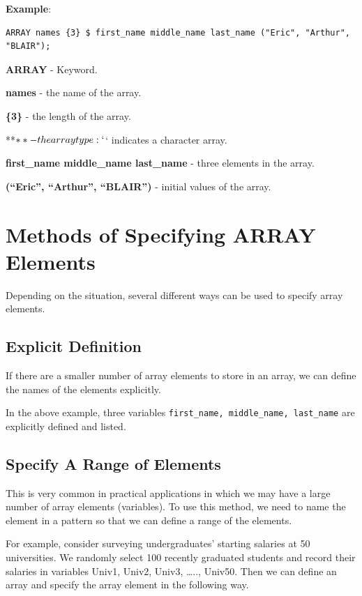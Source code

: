 \documentclass[
]{book}
\begin{document}
\textbf{Example}:

\begin{verbatim}
ARRAY names {3} $ first_name middle_name last_name ("Eric", "Arthur", "BLAIR");
\end{verbatim}

\textbf{ARRAY} - Keyword.

\textbf{names} - the name of the array.

\textbf{\{3\}} - the length of the array.

**\(** - the array type: `\)` indicates a character array.

\textbf{first\_name middle\_name last\_name} - three elements in the array.

\textbf{(``Eric'', ``Arthur'', ``BLAIR'')} - initial values of the array.

\hypertarget{methods-of-specifying-array-elements}{%
\section{Methods of Specifying ARRAY Elements}\label{methods-of-specifying-array-elements}}

Depending on the situation, several different ways can be used to specify array elements.

\hypertarget{explicit-definition}{%
\subsection{Explicit Definition}\label{explicit-definition}}

If there are a smaller number of array elements to store in an array, we can define the names of the elements explicitly.

In the above example, three variables \texttt{first\_name,\ middle\_name,\ last\_name} are explicitly defined and listed.

\hypertarget{specify-a-range-of-elements}{%
\subsection{Specify A Range of Elements}\label{specify-a-range-of-elements}}

This is very common in practical applications in which we may have a large number of array elements (variables). To use this method, we need to name the element in a pattern so that we can define a range of the elements.

For example, consider surveying undergraduates' starting salaries at 50 universities. We randomly select 100 recently graduated students and record their salaries in variables Univ1, Univ2, Univ3, \ldots.., Univ50. Then we can define an array and specify the array element in the following way.
\end{document}
